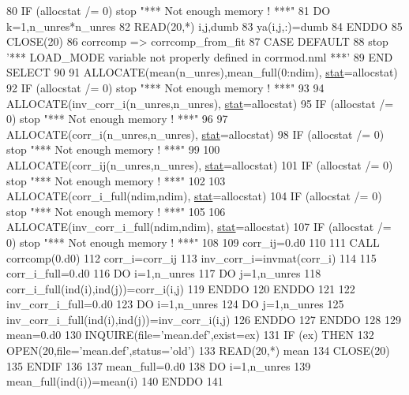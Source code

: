 \begin{DoxyCode}
80        \textcolor{keywordflow}{IF} (allocstat /= 0) stop \textcolor{stringliteral}{"*** Not enough memory ! ***"}
81        \textcolor{keywordflow}{DO} k=1,n\_unres*n\_unres
82           \textcolor{keyword}{READ}(20,*) i,j,dumb
83           ya(i,j,:)=dumb
84 \textcolor{keywordflow}{       ENDDO}
85        \textcolor{keyword}{CLOSE}(20)
86        corrcomp => corrcomp\_from\_fit
87 \textcolor{keywordflow}{    CASE DEFAULT}
88        stop \textcolor{stringliteral}{'*** LOAD\_MODE variable not properly defined in corrmod.nml ***'}
89 \textcolor{keywordflow}{    END SELECT}
90 
91     \textcolor{keyword}{ALLOCATE}(mean(n\_unres),mean\_full(0:ndim), \hyperlink{namespacestat}{stat}=allocstat)
92     \textcolor{keywordflow}{IF} (allocstat /= 0) stop \textcolor{stringliteral}{"*** Not enough memory ! ***"}
93     
94     \textcolor{keyword}{ALLOCATE}(inv\_corr\_i(n\_unres,n\_unres), \hyperlink{namespacestat}{stat}=allocstat)
95     \textcolor{keywordflow}{IF} (allocstat /= 0) stop \textcolor{stringliteral}{"*** Not enough memory ! ***"}
96 
97     \textcolor{keyword}{ALLOCATE}(corr\_i(n\_unres,n\_unres), \hyperlink{namespacestat}{stat}=allocstat)
98     \textcolor{keywordflow}{IF} (allocstat /= 0) stop \textcolor{stringliteral}{"*** Not enough memory ! ***"}
99 
100     \textcolor{keyword}{ALLOCATE}(corr\_ij(n\_unres,n\_unres), \hyperlink{namespacestat}{stat}=allocstat)
101     \textcolor{keywordflow}{IF} (allocstat /= 0) stop \textcolor{stringliteral}{"*** Not enough memory ! ***"}
102 
103     \textcolor{keyword}{ALLOCATE}(corr\_i\_full(ndim,ndim), \hyperlink{namespacestat}{stat}=allocstat)
104     \textcolor{keywordflow}{IF} (allocstat /= 0) stop \textcolor{stringliteral}{"*** Not enough memory ! ***"}
105 
106     \textcolor{keyword}{ALLOCATE}(inv\_corr\_i\_full(ndim,ndim), \hyperlink{namespacestat}{stat}=allocstat)
107     \textcolor{keywordflow}{IF} (allocstat /= 0) stop \textcolor{stringliteral}{"*** Not enough memory ! ***"}
108 
109     corr\_ij=0.d0
110 
111     \textcolor{keyword}{CALL }corrcomp(0.d0)
112     corr\_i=corr\_ij
113     inv\_corr\_i=invmat(corr\_i)
114 
115     corr\_i\_full=0.d0
116     \textcolor{keywordflow}{DO} i=1,n\_unres
117        \textcolor{keywordflow}{DO} j=1,n\_unres
118           corr\_i\_full(ind(i),ind(j))=corr\_i(i,j)
119 \textcolor{keywordflow}{       ENDDO}
120 \textcolor{keywordflow}{    ENDDO}
121     
122     inv\_corr\_i\_full=0.d0
123     \textcolor{keywordflow}{DO} i=1,n\_unres
124        \textcolor{keywordflow}{DO} j=1,n\_unres
125           inv\_corr\_i\_full(ind(i),ind(j))=inv\_corr\_i(i,j)
126 \textcolor{keywordflow}{       ENDDO}
127 \textcolor{keywordflow}{    ENDDO}
128 
129     mean=0.d0
130     \textcolor{keyword}{INQUIRE}(file=\textcolor{stringliteral}{'mean.def'},exist=ex)
131     \textcolor{keywordflow}{IF} (ex) \textcolor{keywordflow}{THEN}
132        \textcolor{keyword}{OPEN}(20,file=\textcolor{stringliteral}{'mean.def'},status=\textcolor{stringliteral}{'old'})
133        \textcolor{keyword}{READ}(20,*) mean
134        \textcolor{keyword}{CLOSE}(20)
135 \textcolor{keywordflow}{    ENDIF}
136 
137     mean\_full=0.d0
138     \textcolor{keywordflow}{DO} i=1,n\_unres
139        mean\_full(ind(i))=mean(i)
140 \textcolor{keywordflow}{    ENDDO}
141 
\end{DoxyCode}
